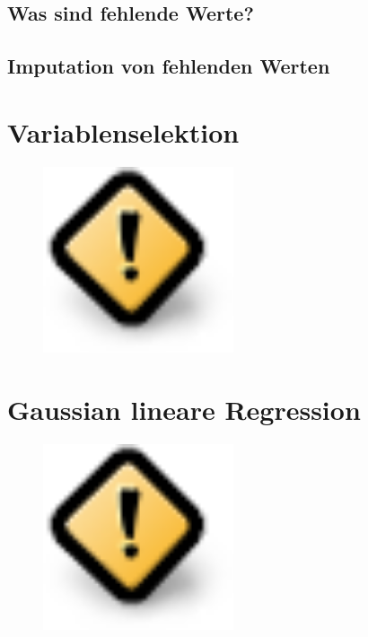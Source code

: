 \documentclass[
  letterpaper,
]{scrbook}
\begin{document}
\hypertarget{was-sind-fehlende-werte}{%
\section{Was sind fehlende Werte?}\label{was-sind-fehlende-werte}}

\hypertarget{imputation-von-fehlenden-werten}{%
\section{Imputation von fehlenden
Werten}\label{imputation-von-fehlenden-werten}}

\hypertarget{variablenselektion}{%
\chapter{Variablenselektion}\label{variablenselektion}}

\begin{figure}

{\centering \includegraphics[width=0.5\textwidth,height=\textheight]{./images/caution.png}

}

\end{figure}

\hypertarget{gaussian-lineare-regression}{%
\chapter{Gaussian lineare
Regression}\label{gaussian-lineare-regression}}

\begin{figure}

{\centering \includegraphics[width=0.5\textwidth,height=\textheight]{./images/caution.png}

}

\end{figure}
\end{document}
